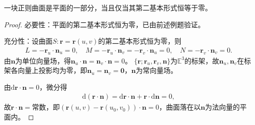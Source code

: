 \documentclass[../../main.tex]{subfiles}%
\begin{document}
\begin{theorem}
一块正则曲面是平面的一部分，当且仅当其第二基本形式恒等于零。
\end{theorem}
\begin{proof}
必要性：平面的第二基本形式恒为零，已由前述例题验证。

充分性：设曲面$S:\boldsymbol{r}=\boldsymbol{r}(u,v)$的第二基本形式恒为零，则
\begin{align*}
L=-\boldsymbol{r}_u\cdot\boldsymbol{n}_u=0,\quad M=-\boldsymbol{r}_u\cdot\boldsymbol{n}_v=-\boldsymbol{r}_v\cdot\boldsymbol{n}_u=0,\quad N=-\boldsymbol{r}_v\cdot\boldsymbol{n}_v=0.
\end{align*}
由$\boldsymbol{n}$为单位向量场，得$\boldsymbol{n}_u\cdot\boldsymbol{n}=\boldsymbol{n}_v\cdot\boldsymbol{n}=0$。
$\{\boldsymbol{r};\boldsymbol{r}_u,\boldsymbol{r}_v,\boldsymbol{n}\}$为$\mathbb{E}^3$的标架，故$\boldsymbol{n}_u,\boldsymbol{n}_v$在标架各向量上投影均为零，即$\boldsymbol{n}_u=\boldsymbol{n}_v=\boldsymbol{0}$，$\boldsymbol{n}$为常向量场。

由$\mathrm{d}\boldsymbol{r}\cdot\boldsymbol{n}=0$，微分得
\begin{align*}
\mathrm{d}(\boldsymbol{r}\cdot\boldsymbol{n})=\mathrm{d}\boldsymbol{r}\cdot\boldsymbol{n}+\boldsymbol{r}\cdot\mathrm{d}\boldsymbol{n}=0,
\end{align*}
故$\boldsymbol{r}\cdot\boldsymbol{n}=$常数，即$(\boldsymbol{r}(u,v)-\boldsymbol{r}(u_0,v_0))\cdot\boldsymbol{n}=0$，曲面落在以$\boldsymbol{n}$为法向量的平面内。
\end{proof}
\end{document}
